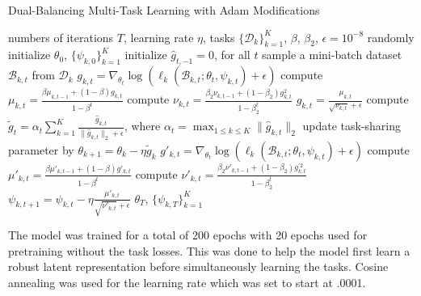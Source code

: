 \documentclass[11pt]{article}
\begin{document}
\begin{algorithm}[H]
    \caption{Dual-Balancing Multi-Task Learning with Adam Modifications}
    \label{alg:dual_balancing}
    \begin{algorithmic}[1]
    \Require numbers of iterations $T$, learning rate $\eta$, tasks $\{ \mathcal{D}_k \}_{k=1}^K$, $\beta$, $\beta_2$, $\epsilon = 10^{-8}$
    \State randomly initialize $\theta_0$, $\{\psi_{k,0}\}_{k=1}^K$
    \State initialize $\hat{g}_{t,-1} = 0$, for all $t$
            \State sample a mini-batch dataset $\mathcal{B}_{k,t}$ from $\mathcal{D}_k$
            \State $g_{k, t} = \nabla_{\theta_t} \log(\ell_k(\mathcal{B}_{k, t}; \theta_t, \psi_{k, t}) + \epsilon)$
            \State compute $\mu_{k, t} = \frac{\beta \mu_{k, t-1} + (1 - \beta) g_{k, t}}{1 - \beta^t}$
            \State compute $\nu_{k, t} = \frac{\beta_2 \nu_{k, t - 1} + (1 - \beta_2) g_{k, t}^2}{1 - \beta_{2}^{t}}$
            \State $\hat{g}_{k, t} = \frac{\mu_{k, t}}{\sqrt{\nu_{k, t}} + \epsilon}$
        \EndFor
        \State compute $\tilde{g}_t = \alpha_t \sum_{k=1}^K \frac{\hat{g}_{k, t}}{\|\hat{g}_{k, t}\|_2 + \epsilon}$, where $\alpha_t = \max_{1 \leq k \leq K} \|\hat{g}_{k, t}\|_2$
        \State update task-sharing parameter by $\theta_{k+1} = \theta_k - \eta \tilde{g}_k$
            \State $g'_{k, t} = \nabla_{\theta_t} \log(\ell_k(\mathcal{B}_{k, t}; \theta_t, \psi_{k, t}) + \epsilon)$
            \State compute $\mu'_{k, t} = \frac{\beta \mu'_{k, t-1} + (1 - \beta) g'_{k, t}}{1 - \beta^t}$
            \State compute $\nu'_{k, t} = \frac{\beta_2 \nu'_{k, t - 1} + (1 - \beta_2) g_{k, t}^{'2}}{1 - \beta_{2}^{t}}$
            \State $\psi_{k,t+1} = \psi_{k, t} - \eta \frac{\mu'_{k, t}}{\sqrt{\nu'_{k, t}} + \epsilon}$
        \EndFor
    \EndFor
    \Return $\theta_T$, $\{\psi_{k,T}\}_{k=1}^K$
    \end{algorithmic}
\end{algorithm}


The model was trained for a total of 200 epochs with 20 epochs 
used for pretraining without the task losses. This was done to 
help the model first learn a robust latent representation before 
simultaneously learning the tasks. Cosine annealing was used for the learning rate 
which was set to start at .0001.
\end{document}
